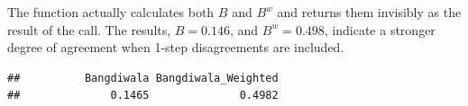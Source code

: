 \documentclass[11pt]{book}
\renewenvironment{knitrout}{\small\renewcommand{\baselinestretch}{.85}}{} %
\begin{document}
The function  actually calculates both $B$ and $B^w$
and returns them invisibly as the result of the call.
The results, $B = 0.146$, and $B^w = 0.498$, indicate a stronger
degree of agreement when 1-step disagreements are included.
\begin{knitrout}
\color{fgcolor}\begin{kframe}
\begin{alltt}
 \hlkwb{<-}
\hlstd{(B)[}\hlopt{:}\hlstd{]}
\end{alltt}
\begin{verbatim}
##          Bangdiwala Bangdiwala_Weighted 
##              0.1465              0.4982
\end{verbatim}
\end{kframe}
\end{knitrout}
\end{document}
